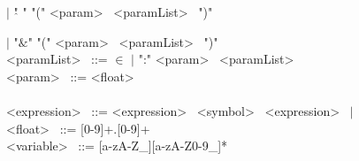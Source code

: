 \hspace{1cm} $|$ "$\hat{}$ " "("  \textless param\textgreater~ \textless paramList\textgreater~ ")" 

\hspace{1cm} $|$ "$\&$" "("  \textless param\textgreater~ \textless paramList\textgreater~ ")" \\
\textless paramList\textgreater~ ::=  $\in$ $|$ ":" \textless param\textgreater~ \textless paramList\textgreater~ \\
\textless param\textgreater~ ::= \textless float\textgreater~ \\
\\
\textless expression\textgreater~ ::=  \textless expression\textgreater~ \textless symbol\textgreater~ \textless expression\textgreater~ $|$ 
\\
\textless float\textgreater~ ::= [0-9]+.[0-9]+ \\
\textless variable\textgreater~ ::= [a-zA-Z\_][a-zA-Z0-9\_]* \\



